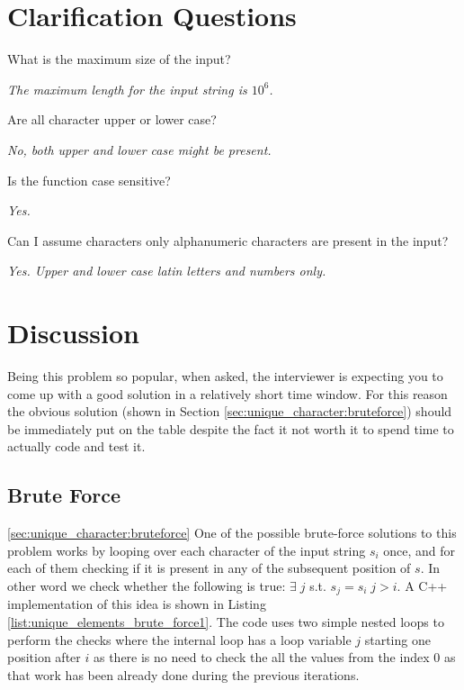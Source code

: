 \section{Clarification Questions}

\begin{QandA}
	\item What is the maximum size of the input?
	\begin{answered}
		\textit{The maximum length for the input string is $10^6$.}
	\end{answered}
	
	\item Are all character upper or lower case?
	\begin{answered}
		\textit{No, both upper and lower case might be present.}
	\end{answered}

	\item Is the function case sensitive?
	\begin{answered}
		\textit{Yes.}
	\end{answered}

	\item Can I assume characters only alphanumeric characters are present in the input?
	\begin{answered}
		\textit{Yes. Upper and lower case latin letters and numbers only.}
	\end{answered}
\end{QandA}

\section{Discussion}
Being this problem so popular, when asked, the interviewer is expecting you to come up
with a good solution in a relatively short time window. 
For this reason the obvious solution (shown in Section \ref{sec:unique_character:bruteforce})
should be immediately put on the table despite the fact it not worth it to spend time to actually code and test it.

\subsection{Brute Force}
\ref{sec:unique_character:bruteforce}
One of the possible brute-force solutions to this problem works by looping over each character of the input string $s_i$ once,
and for each of them checking if it is present in any of the subsequent position of $s$. 
In other word we check whether the following is true: $\exists \; j $ s.t.  $s_j=s_i \; j>i$.
A C++ implementation of this idea is shown in Listing \ref{list:unique_elements_brute_force1}. 
The code uses  two simple nested loops to perform the checks where the internal loop has a loop variable $j$ starting one
position after $i$ as there is no need to check the all the values from the index $0$ as that work has been already done during the previous iterations. 

